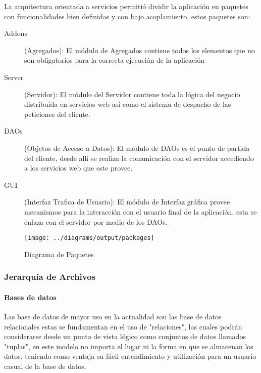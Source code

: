La arquitectura orientada a servicios permitió dividir la aplicación en paquetes con funcionalidades bien definidas y con bajo acoplamiento, estos paquetes son:

\begin{description}
	
	\item[Addons] (Agregados):\newline
	El módulo de Agregados contiene todos los elementos que no son obligatorios para la correcta ejecución de la aplicación
	
	\item[Server] (Servidor):\newline
	El módulo del Servidor contiene toda la lógica del negocio distribuida en servicios web así como el sistema de despacho de las peticiones del cliente.
	
	\item[DAOs] (Objetos de Acceso a Datos):\newline
	El módulo de DAOs es el punto de partida del cliente, desde allí se realiza la comunicación con el servidor accediendo a los servicios web que este provee.
	
	\item[GUI] (Interfaz Trafica de Usuario):\newline
	El módulo de Interfaz gráfica provee mecanismos para la interacción con el usuario final de la aplicación, esta se enlaza con el servidor por medio de los DAOs.
	
\end{description}

\begin{landscape}
\begin{figure}
 \centering
 \texttt{[image: ../diagrams/output/packages]}
 \caption{Diagrama de Paquetes}
 \label{diagrama:paquetes}
\end{figure}
\end{landscape}


\subsubsection{Jerarquía de Archivos}

\paragraph{Bases de datos}

Las base de datos de mayor uso en la actualidad son las base de datos relacionales estas se fundamentan en el uso de "relaciones", las cuales podrán considerarse desde un punto de vista lógico como conjuntos de datos llamados "tuplas", en este modelo no importa el lugar ni la forma en que se almacenan los datos, teniendo como ventaja su fácil entendimiento y utilización para un usuario casual de la base de datos.

